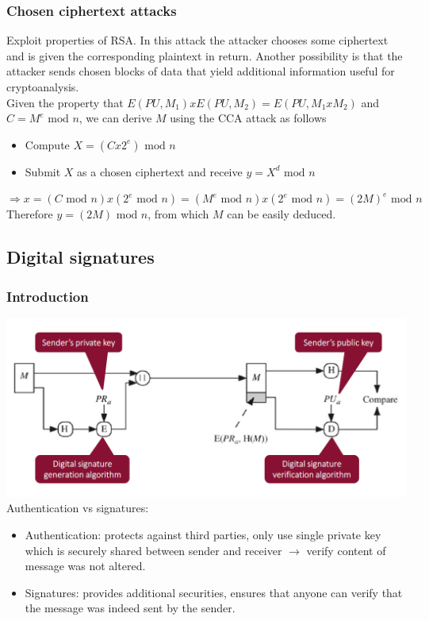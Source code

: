 \documentclass[12pt]{article}
\begin{document}
 \subsubsection{Chosen ciphertext attacks}
 Exploit properties of RSA. In this attack the attacker chooses some ciphertext and is given the corresponding plaintext in return. Another possibility is that the attacker sends chosen blocks of data that yield additional information useful for cryptoanalysis.\\
 Given the property that $E(PU,M_1)xE(PU,M_2) = E(PU, M_1xM_2)$ and $C=M^e\text{ mod }n$, we can derive $M$ using the CCA attack as follows
 \begin{itemize}
 	\item Compute $X = (Cx2^e)\text{ mod }n$
 	\item Submit $X$ as a chosen ciphertext and receive $y = X^d\text{ mod }n$
 \end{itemize}
$\Rightarrow x = (C\text{ mod }n)x(2^e\text{ mod }n) = (M^e\text{ mod }n)x(2^e\text{ mod }n) = (2M)^e\text{ mod }n$\\
Therefore $y = (2M)\text{ mod }n$, from which $M$ can be easily deduced.
 
 \subsection{Digital signatures}
 \subsubsection{Introduction}
 \includegraphics[width=\linewidth]{./slides/L4P5intro.PNG}\\
 Authentication vs signatures:
 \begin{itemize}
 	\item Authentication: protects against third parties, only use single private key which is securely shared between sender and receiver $\rightarrow$ verify content of message was not altered.
 	\item Signatures: provides additional securities, ensures that anyone can verify that the message was indeed sent by the sender.
 \end{itemize}
\end{document}
